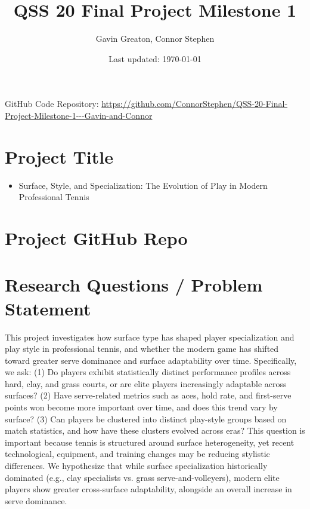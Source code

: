 \documentclass[12pt]{article}
\title{\bf QSS 20 Final Project Milestone 1}
\author{Gavin Greaton, Connor Stephen}
\date{Last updated: \today}
\begin{document}
\maketitle

\begin{center}
GitHub Code Repository: \url{https://github.com/ConnorStephen/QSS-20-Final-Project-Milestone-1---Gavin-and-Connor}
\end{center}


\section{Project Title}

{\color{black}
\begin{itemize}
    \item Surface, Style, and Specialization: The Evolution of Play in Modern Professional Tennis
\end{itemize} 
}

\section{Project GitHub Repo}

\section{Research Questions / Problem Statement}

{\color{black}
This project investigates how surface type has shaped player specialization and play style in professional tennis, and whether the modern game has shifted toward greater serve dominance and surface adaptability over time. Specifically, we ask: (1) Do players exhibit statistically distinct performance profiles across hard, clay, and grass courts, or are elite players increasingly adaptable across surfaces? (2) Have serve-related metrics such as aces, hold rate, and first-serve points won become more important over time, and does this trend vary by surface? (3) Can players be clustered into distinct play-style groups based on match statistics, and how have these clusters evolved across eras? This question is important because tennis is structured around surface heterogeneity, yet recent technological, equipment, and training changes may be reducing stylistic differences. We hypothesize that while surface specialization historically dominated (e.g., clay specialists vs. grass serve-and-volleyers), modern elite players show greater cross-surface adaptability, alongside an overall increase in serve dominance.

}
\end{document}
